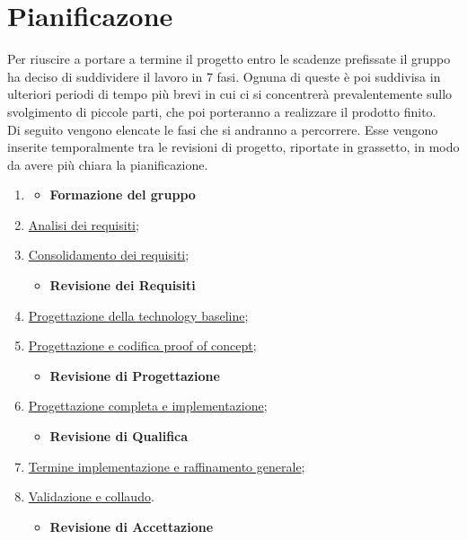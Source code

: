 \section{Pianificazone} \label{_pianificazione}
Per riuscire a portare a termine il progetto entro le scadenze prefissate il gruppo ha deciso di suddividere il lavoro in 7 fasi. Ognuna di queste è poi suddivisa in ulteriori periodi di tempo più brevi in cui ci si concentrerà prevalentemente sullo svolgimento di piccole parti, che poi porteranno a realizzare il prodotto finito.\\
Di seguito vengono elencate le fasi che si andranno a percorrere. Esse vengono inserite temporalmente tra le revisioni di progetto, riportate in grassetto, in modo da avere più chiara la pianificazione.
\begin{enumerate}
    \item []
          \begin{itemize}
              \item [] \textbf{Formazione del gruppo}
          \end{itemize}
    \item \hyperref[_pianificazioneAnalisiDeiRequisiti]{Analisi dei requisiti};
    \item \hyperref[_pianificazioneConsolidamentoDeiRequisiti]{Consolidamento dei requisiti};
          \begin{itemize}
              \item [] \textbf{Revisione dei Requisiti}
          \end{itemize}
    \item \hyperref[_pianificazioneProgettazioneTechnologyBaseline]{Progettazione della technology baseline};
    \item \hyperref[_pianificazioneCodificaPoC]{Progettazione e codifica proof of concept};
          \begin{itemize}
              \item [] \textbf{Revisione di Progettazione}
          \end{itemize}
    \item \hyperref[_pianificazioneProgettazioneCompletaImplementazione]{Progettazione completa e implementazione};
          \begin{itemize}
              \item [] \textbf{Revisione di Qualifica}
          \end{itemize}
    \item \hyperref[_pianificazioneTermineImplementazione]{Termine implementazione e raffinamento generale};
    \item \hyperref[_pianificazioneValidazioneCollaudo]{Validazione e collaudo}.
          \begin{itemize}
              \item [] \textbf{Revisione di Accettazione}
          \end{itemize}
\end{enumerate}

